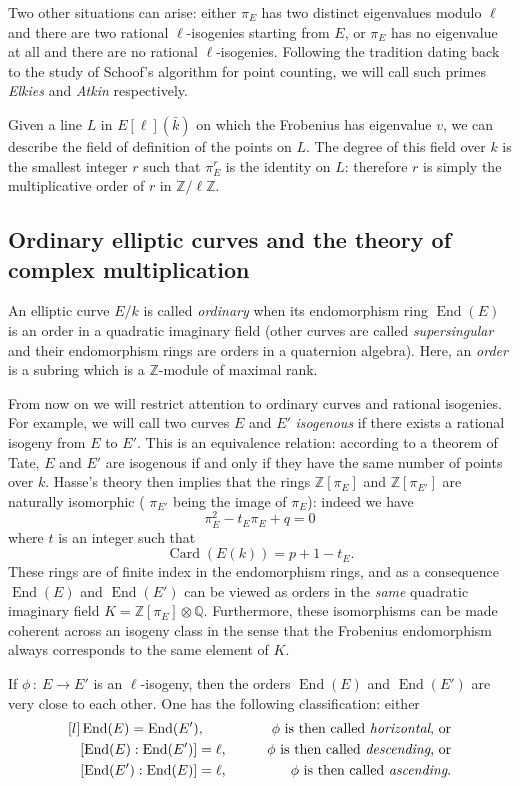 \documentclass{article}
\newcommand{\Q}{\mathbb{Q}}
\newcommand{\Z}{\mathbb{Z}}
\newcommand{\from}{\ensuremath{\,:\ }}
\theoremstyle{definition}
\DeclareMathOperator{\End}{End}
\DeclareMathOperator{\Card}{Card}
\begin{document}
Two other situations can arise: either $\pi_E$ has two distinct eigenvalues 
modulo $\ell$ and there are two rational $\ell$-isogenies starting from $E$, or 
$\pi_E$ has no eigenvalue at all and there are no rational $\ell$-isogenies. 
Following the tradition dating back to the study of Schoof's algorithm for 
point counting, we will call such primes \emph{Elkies} and \emph{Atkin} 
respectively.

Given a line $L$ in $E[\ell](\bar{k})$ on which the Frobenius has eigenvalue $v$,
we can describe the field of definition of the points on $L$. The degree of this
field over $k$ is the smallest integer $r$ such that $\pi_E^r$ is the identity
on $L$: therefore $r$ is simply the multiplicative order of $r$ in $\Z/\ell\Z$.



\subsection{Ordinary elliptic curves and the theory of complex multiplication}

An elliptic curve $E/k$ is called \emph{ordinary} when its endomorphism ring $
\End(E)$ is an order in a quadratic imaginary field (other curves are called 
\emph{supersingular} and their endomorphism rings are orders in a quaternion 
algebra). Here, an \emph{order} is a subring which is a $\Z$-module of maximal 
rank. 

From now on we will restrict attention to ordinary curves and rational 
isogenies. For example, we will call two curves $E$ and $E'$ \emph{isogenous} 
if there exists a rational isogeny from $E$ to $E'$. This is an equivalence 
relation: according to a theorem of Tate, $E$ and $E'$ are isogenous if and 
only if they have the same number of points over $k$. Hasse's theory then 
implies that the rings $\Z[\pi_E]$ and $\Z[\pi_{E'}]$ are naturally isomorphic (
$\pi_{E'}$ being the image of $\pi_{E}$): indeed we have
\[
\pi_E^2 - t_E\pi_E + q = 0
\]
where $t$ is an integer such that
\[
\Card(E(k)) = p + 1 - t_E.
\]
These rings are of finite index in the endomorphism rings, and as a consequence 
$\End(E)$ and $\End(E')$ can be viewed as orders in the \emph{same} quadratic 
imaginary field $K = \Z[\pi_E]\otimes\Q$. Furthermore, these isomorphisms can 
be made coherent across an isogeny class in the sense that the Frobenius 
endomorphism always corresponds to the same element of $K$.

If $\phi\from E\to E'$ is an $\ell$-isogeny, then the orders $\End(E)$ and $\End
(E')$ are very close to each other. One has the following classification: either
\[
\begin{aligned}[l]
&\End(E) = \End(E'),
&\qquad\text{$\phi$ is then called \emph{horizontal}, or} &\\
&[\End(E):\End(E')] = \ell,
&\qquad\text{$\phi$ is then called \emph{descending}, or} &\\
&[\End(E'):\End(E)] = \ell,
&\qquad\text{$\phi$ is then called \emph{ascending}.} &
\end{aligned}
\]
\end{document}
